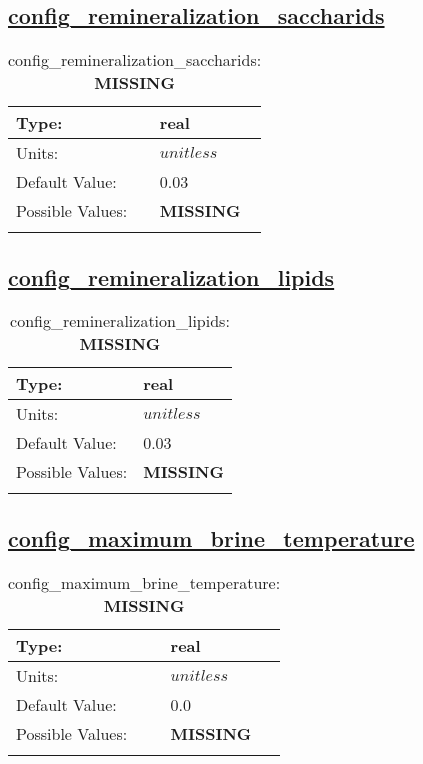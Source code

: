 \subsection[config\_remineralization\_saccharids]{\hyperref[sec:nm_tab_biogeochemistry]{config\_remineralization\_saccharids}}
\label{subsec:nm_sec_config_remineralization_saccharids}
\begin{center}
\begin{longtable}{| p{2.0in} || p{4.0in} |}
    \hline
    Type: & real \\
    \hline
    Units: & $unitless$ \\
    \hline
    Default Value: & 0.03 \\
    \hline
    Possible Values: & {\bf \color{red} MISSING} \\
    \hline
    \caption{config\_remineralization\_saccharids: {\bf \color{red} MISSING}}
\end{longtable}
\end{center}
\subsection[config\_remineralization\_lipids]{\hyperref[sec:nm_tab_biogeochemistry]{config\_remineralization\_lipids}}
\label{subsec:nm_sec_config_remineralization_lipids}
\begin{center}
\begin{longtable}{| p{2.0in} || p{4.0in} |}
    \hline
    Type: & real \\
    \hline
    Units: & $unitless$ \\
    \hline
    Default Value: & 0.03 \\
    \hline
    Possible Values: & {\bf \color{red} MISSING} \\
    \hline
    \caption{config\_remineralization\_lipids: {\bf \color{red} MISSING}}
\end{longtable}
\end{center}
\subsection[config\_maximum\_brine\_temperature]{\hyperref[sec:nm_tab_biogeochemistry]{config\_maximum\_brine\_temperature}}
\label{subsec:nm_sec_config_maximum_brine_temperature}
\begin{center}
\begin{longtable}{| p{2.0in} || p{4.0in} |}
    \hline
    Type: & real \\
    \hline
    Units: & $unitless$ \\
    \hline
    Default Value: & 0.0 \\
    \hline
    Possible Values: & {\bf \color{red} MISSING} \\
    \hline
    \caption{config\_maximum\_brine\_temperature: {\bf \color{red} MISSING}}
\end{longtable}
\end{center}

